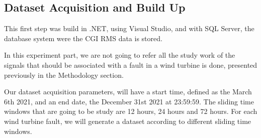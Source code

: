 \subsection{Dataset Acquisition and Build Up}
This first step was build in .NET, using Visual Studio, and with SQL Server, the database system were the CGI RMS data is stored.

In this experiment part, we are not going to refer all the study work of the signals that should be associated with a fault in a wind turbine is done, presented previously in the Methodology section.

Our dataset acquisition parameters, will have a start time, defined as the March 6th 2021, and an end date, the December 31st 2021 at 23:59:59. The sliding time windows that are going to be study are 12 hours, 24 hours and 72 hours.
For each wind turbine fault, we will generate a dataset according to different sliding time windows.



